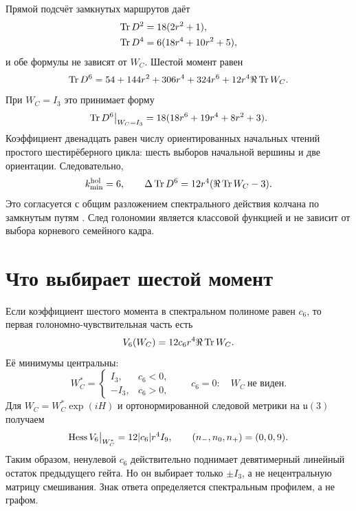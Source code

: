 Прямой подсчёт замкнутых маршрутов даёт
\begin{align}
 \operatorname{Tr} D^2&=18(2r^2+1),\nonumber\\
 \operatorname{Tr} D^4&=6(18r^4+10r^2+5),
 \label{eq:v7-cycle-moment-low-traces}
\end{align}
и обе формулы не зависят от $W_C$. Шестой момент равен
\begin{equation}
 \operatorname{Tr} D^6
 =54+144r^2+306r^4+324r^6
 +12r^4\Re\operatorname{Tr} W_C.
 \label{eq:v7-cycle-moment-sixth-trace}
\end{equation}
При $W_C=I_3$ это принимает форму
\begin{equation}
 \operatorname{Tr} D^6\big|_{W_C=I_3}
 =18(18r^6+19r^4+8r^2+3).
 \label{eq:v7-cycle-moment-sixth-trivial}
\end{equation}
Коэффициент двенадцать равен числу ориентированных начальных чтений простого
шестирёберного цикла: шесть выборов начальной вершины и две ориентации.
Следовательно,
\begin{equation}
 k_{\min}^{\rm hol}=6,\qquad
 \Delta\operatorname{Tr} D^6=12r^4(\Re\operatorname{Tr} W_C-3).
 \label{eq:v7-cycle-moment-first-sensitive-degree}
\end{equation}
Это согласуется с общим разложением спектрального действия колчана по
замкнутым путям \cite{v7-cycle-moment-perez}. След голономии является
классовой функцией и не зависит от выбора корневого семейного кадра.

\section{Что выбирает шестой момент}

Если коэффициент шестого момента в спектральном полиноме равен $c_6$, то
первая голономно-чувствительная часть есть
\begin{equation}
 V_6(W_C)=12c_6r^4\Re\operatorname{Tr} W_C.
 \label{eq:v7-cycle-moment-holonomy-potential}
\end{equation}
Её минимумы центральны:
\begin{equation}
 W_C^*=\begin{cases}
 I_3,&c_6<0,\\
 -I_3,&c_6>0,
 \end{cases}
 \qquad
 c_6=0:\quad W_C\ \text{не виден}.
 \label{eq:v7-cycle-moment-central-minima}
\end{equation}
Для $W_C=W_C^*\exp(iH)$ и ортонормированной следовой метрики на
$\mathfrak u(3)$ получаем
\begin{equation}
 \operatorname{Hess} V_6\big|_{W_C^*}=12|c_6|r^4I_9,
 \qquad (n_-,n_0,n_+)=(0,0,9).
 \label{eq:v7-cycle-moment-holonomy-hessian}
\end{equation}
Таким образом, ненулевой $c_6$ действительно поднимает девятимерный
линейный остаток предыдущего гейта. Но он выбирает только $\pm I_3$, а не
нецентральную матрицу смешивания. Знак ответа определяется спектральным
профилем, а не графом.

